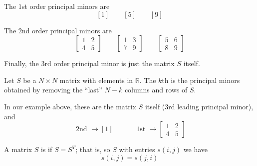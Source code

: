 \documentclass{article}
\begin{document}
The $1$st order principal minors are
\[
  [1]
  \quad\quad
  [5]
  \quad\quad
  [9]
\]

The $2$nd order principal minors are
\[
  \left[\begin{matrix}
    1 & 2 \\
    4 & 5
  \end{matrix}\right]
  \quad\quad
  \left[\begin{matrix}
    1 & 3 \\
    7 & 9
  \end{matrix}\right]
  \quad\quad
  \left[\begin{matrix}
    5 & 6 \\
    8 & 9
  \end{matrix}\right]
\]

Finally, the $3$rd order principal minor is just the matrix $S$ itself.

\begin{definition}
  Let $S$ be a $N \times N$ matrix with elements in $\mathbb{R}$. The $k$th  is the principal minors obtained by removing the ``last'' $N - k$ columns and rows of $S$.
\end{definition}

In our example above, these are the matrix $S$ itself ($3$rd leading principal minor), and
\[
  \text{ 2nd }
  \rightarrow
  [1]
  \quad\quad\quad
  \text{ 1st }
  \rightarrow
  \left[\begin{matrix}
    1 & 2 \\
    4 & 5
  \end{matrix}\right]
\]

\begin{definition}
  A matrix $S$ is  if $S = S^T$; that is, so $S$ with entries $s(i, j)$ we have
  \[
    s(i, j) = s(j, i)
  \]
\end{definition}
\end{document}
